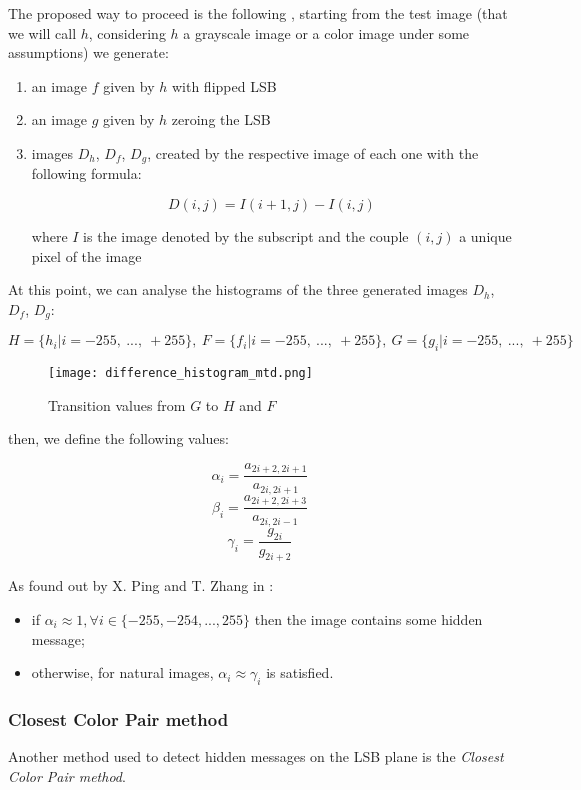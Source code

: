 \documentclass[../../main.tex]{subfiles}
\begin{document}
    The proposed way to proceed is the following
    \cite{new-detection-lsb-steganography}, starting from the test image (that
    we will call $h$, considering $h$ a grayscale image or a color image under
    some assumptions) we generate:
    \begin{enumerate}
        \item an image $f$ given by $h$ with flipped LSB
        \item an image $g$ given by $h$ zeroing the LSB
        \item images $D_h$, $D_f$, $D_g$, created by the respective image of
              each one with the following formula:

              \[ D(i,j) = I(i+1,j) - I(i,j) \]

              where $I$ is the image denoted by the subscript and the couple
              $(i,j)$ a unique pixel of the image
    \end{enumerate}

    At this point, we can analyse the histograms of the three generated images
    $D_h$, $D_f$, $D_g$:

    \[
        H = \{h_i | i = -255,\ ...,\ +255\},\ 
        F = \{f_i | i = -255,\ ...,\ +255\},\ 
        G = \{g_i | i = -255,\ ...,\ +255\}
    \]

    \begin{figure}[h]
        \centering
        \caption{Transition values from $G$ to $H$ and $F$}
        \texttt{[image: difference\_histogram\_mtd.png]}
    \end{figure}

    then, we define the following values:

    \[ \alpha_i = \frac{a_{2i+2,2i+1}}{a_{2i,2i+1}} \]
    \[ \beta_i = \frac{a_{2i+2,2i+3}}{a_{2i,2i-1}} \]
    \[ \gamma_i = \frac{g_{2i}}{g_{2i+2}} \]

    As found out by X. Ping and T. Zhang in
    \cite{new-detection-lsb-steganography}:

    \begin{itemize}
        \item if $\alpha_i \approx 1, \forall i \in \{-255, -254, ..., 255\}$
              then the image contains some hidden message;
        \item otherwise, for natural images, $\alpha_i \approx \gamma_i$ is
              satisfied.
    \end{itemize}
    
    \subsubsection{Closest Color Pair method}
    Another method used to detect hidden messages on the LSB plane is the
    \emph{Closest Color Pair method}.
\end{document}
